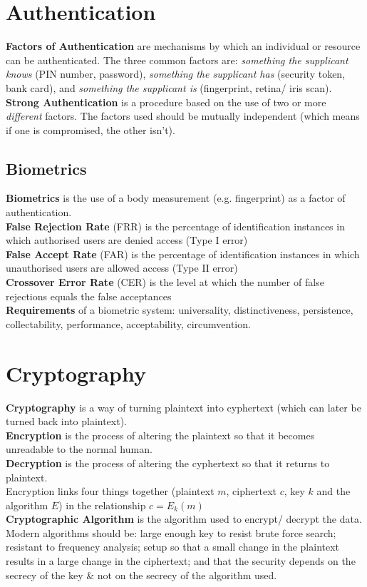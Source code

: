 \documentclass[a4paper,11pt]{article}
\begin{document}
\section{Authentication}
\textbf{Factors of Authentication} are mechanisms by which an individual or resource can be authenticated. The three common factors are: \textit{something the supplicant knows} (PIN number, password), \textit{something the supplicant has} (security token, bank card), and \textit{something the supplicant is} (fingerprint, retina/ iris scan).\\
\textbf{Strong Authentication} is a procedure based on the use of two or more \textit{different} factors. The factors used should be mutually independent (which means if one is compromised, the other isn't).\\
\subsection{Biometrics}
\textbf{Biometrics} is the use of a body measurement (e.g. fingerprint) as a factor of authentication.\\
\textbf{False Rejection Rate} (FRR) is the percentage of identification instances in which authorised users are denied access (Type I error)\\
\textbf{False Accept Rate} (FAR) is the percentage of identification instances in which unauthorised users are allowed access (Type II error)\\
\textbf{Crossover Error Rate} (CER) is the level at which the number of false rejections equals the false acceptances\\
\textbf{Requirements} of a biometric system: universality, distinctiveness, persistence, collectability, performance, acceptability, circumvention.

\section{Cryptography}
\textbf{Cryptography} is a way of turning plaintext into cyphertext (which can later be turned back into plaintext).\\
\textbf{Encryption} is the process of altering the plaintext so that it becomes unreadable to the normal human.\\
\textbf{Decryption} is the process of altering the cyphertext so that it returns to plaintext.\\
Encryption links four things together (plaintext $m$, ciphertext $c$, key $k$ and the algorithm $E$) in the relationship $c = E_k(m)$\\
\textbf{Cryptographic Algorithm} is the algorithm used to encrypt/ decrypt the data. Modern algorithms should be: large enough key to resist brute force search; resistant to frequency analysis; setup so that a small change in the plaintext results in a large change in the ciphertext; and that the security depends on  the secrecy of the key \& not on the secrecy of the algorithm used.
\end{document}
